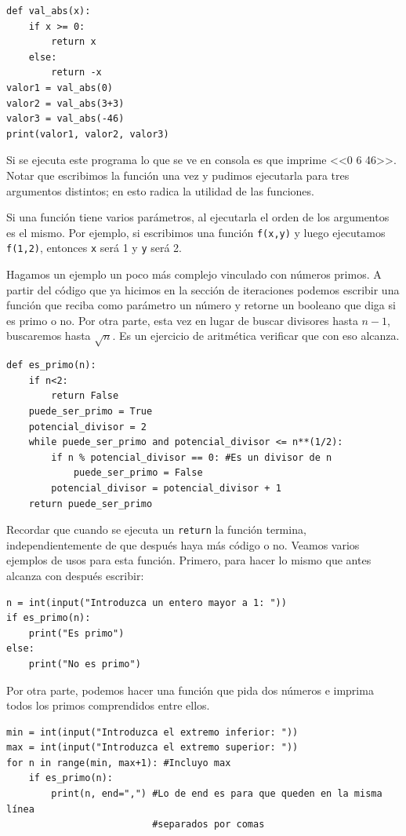 \documentclass[a4paper, 12pt]{report}
\theoremstyle{definition}
\begin{document}
\begin{verbatim}
def val_abs(x):
    if x >= 0:
        return x
    else:
        return -x
valor1 = val_abs(0)
valor2 = val_abs(3+3)
valor3 = val_abs(-46)
print(valor1, valor2, valor3)
\end{verbatim}
Si se ejecuta este programa lo que se ve en consola es que imprime <<0 6 46>>. Notar que escribimos la función una vez y pudimos ejecutarla para tres argumentos distintos; en esto radica la utilidad de las funciones.

Si una función tiene varios parámetros, al ejecutarla el orden de los argumentos es el mismo. Por ejemplo, si escribimos una función {\tt f(x,y)} y luego ejecutamos {\tt f(1,2)}, entonces {\tt x} será 1 y {\tt y} será 2.

Hagamos un ejemplo un poco más complejo vinculado con números primos. A partir del código que ya hicimos en la sección de iteraciones podemos escribir una función que reciba como parámetro un número y retorne un booleano que diga si es primo o no. Por otra parte, esta vez en lugar de buscar divisores hasta $n-1$, buscaremos hasta $\sqrt{n}$. Es un ejercicio de aritmética verificar que con eso alcanza.
\begin{verbatim}
def es_primo(n):
    if n<2:
        return False
    puede_ser_primo = True
    potencial_divisor = 2
    while puede_ser_primo and potencial_divisor <= n**(1/2):
        if n % potencial_divisor == 0: #Es un divisor de n
            puede_ser_primo = False
        potencial_divisor = potencial_divisor + 1
    return puede_ser_primo
\end{verbatim}
Recordar que cuando se ejecuta un {\tt return} la función termina, independientemente de que después haya más código o no. Veamos varios ejemplos de usos para esta función. Primero, para hacer lo mismo que antes alcanza con después escribir:
\begin{verbatim}
n = int(input("Introduzca un entero mayor a 1: "))
if es_primo(n):
    print("Es primo")
else:
    print("No es primo")
\end{verbatim}
Por otra parte, podemos hacer una función que pida dos números e imprima todos los primos comprendidos entre ellos.
\begin{verbatim}
min = int(input("Introduzca el extremo inferior: "))
max = int(input("Introduzca el extremo superior: "))
for n in range(min, max+1): #Incluyo max
    if es_primo(n):
        print(n, end=",") #Lo de end es para que queden en la misma línea
                          #separados por comas
\end{verbatim}
\end{document}

